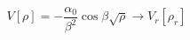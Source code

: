 \begin{equation}
V[\rho] = -\frac {\alpha_0} {\beta^2} \cos \beta \sqrt{\rho} \rightarrow V_r[\rho_r]
\end{equation}

